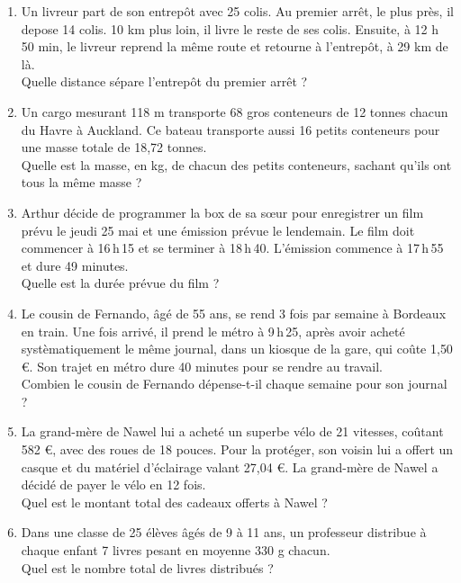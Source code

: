 \documentclass[11pt]{article}
\begin{document}
\begin{exercice}
  \begin{enumerate}
\item Un livreur part de son entrepôt avec 25 colis. Au premier arrêt, le plus près, il depose 14 colis. 10 km plus loin, il livre le reste de ses colis. Ensuite, à 12 h 50 min, le livreur reprend la même route et retourne à l'entrepôt, à 29 km de là.\\
Quelle distance sépare l'entrepôt du premier arrêt ?
\item Un cargo mesurant 118 m transporte 68 gros conteneurs de 12 tonnes chacun du Havre à Auckland. Ce bateau transporte aussi 16 petits conteneurs pour une masse totale de 18,72 tonnes.\\
Quelle est la masse, en kg, de chacun des petits conteneurs, sachant qu'ils ont tous la même masse ?
\item Arthur décide de programmer la box de sa sœur pour enregistrer un film prévu le jeudi 25 mai et une émission prévue le lendemain. Le film doit commencer à 16\,h\,15 et se terminer à 18\,h\,40. L'émission commence à 17\,h\,55 et dure 49 minutes.\\
Quelle est la durée prévue du film ?
\item Le cousin de Fernando, âgé de 55 ans, se rend 3 fois par semaine à Bordeaux en train. Une fois arrivé, il prend le métro à 9\,h\,25, après avoir acheté systèmatiquement le même journal, dans un kiosque de la gare, qui coûte 1,50 €. Son trajet en métro dure 40 minutes pour se rendre au travail.\\
Combien le cousin de Fernando dépense-t-il chaque semaine pour son journal ?
\item La grand-mère de Nawel lui a acheté un superbe vélo de 21 vitesses, coûtant 582 €, avec des roues de 18 pouces. Pour la protéger, son voisin lui a offert un casque et du matériel d'éclairage valant 27,04 €. La grand-mère de Nawel a décidé de payer le vélo en 12 fois.\\
Quel est le montant total des cadeaux offerts à Nawel ?
\item Dans une classe de 25 élèves âgés de 9  à 11  ans, un professeur distribue à chaque enfant 7 livres pesant en moyenne 330 g chacun.\\
Quel est le nombre total de livres distribués ?
  \end{enumerate}
\end{exercice}
\end{document}
